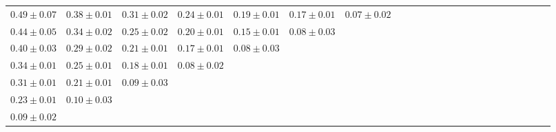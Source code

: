 \begin{table}[ht]
{{\begin{adjustbox}{width=\textwidth}
\begin{tabular}{ccccccccccccccccccccccc}
$0.49 \pm 0.07$ & $0.38 \pm 0.01$ & $0.31 \pm 0.02$ & $0.24 \pm 0.01$ & $0.19 \pm 0.01$ & $0.17 \pm 0.01$ & $0.07 \pm 0.02$ &  &  &  &  &  &  &  &  &  &  &  &  &  &  &  &  \\
$0.44 \pm 0.05$ & $0.34 \pm 0.02$ & $0.25 \pm 0.02$ & $0.20 \pm 0.01$ & $0.15 \pm 0.01$ & $0.08 \pm 0.03$ &  &  &  &  &  &  &  &  &  &  &  &  &  &  &  &  &  \\
$0.40 \pm 0.03$ & $0.29 \pm 0.02$ & $0.21 \pm 0.01$ & $0.17 \pm 0.01$ & $0.08 \pm 0.03$ &  &  &  &  &  &  &  &  &  &  &  &  &  &  &  &  &  &  \\
$0.34 \pm 0.01$ & $0.25 \pm 0.01$ & $0.18 \pm 0.01$ & $0.08 \pm 0.02$ &  &  &  &  &  &  &  &  &  &  &  &  &  &  &  &  &  &  &  \\
$0.31 \pm 0.01$ & $0.21 \pm 0.01$ & $0.09 \pm 0.03$ &  &  &  &  &  &  &  &  &  &  &  &  &  &  &  &  &  &  &  &  \\
$0.23 \pm 0.01$ & $0.10 \pm 0.03$ &  &  &  &  &  &  &  &  &  &  &  &  &  &  &  &  &  &  &  &  &  \\
$0.09 \pm 0.02$ &  &  &  &  &  &  &  &  &  &  &  &  &  &  &  &  &  &  &  &  &  &  \\



\end{tabular}
\end{adjustbox}}}
\end{table}
